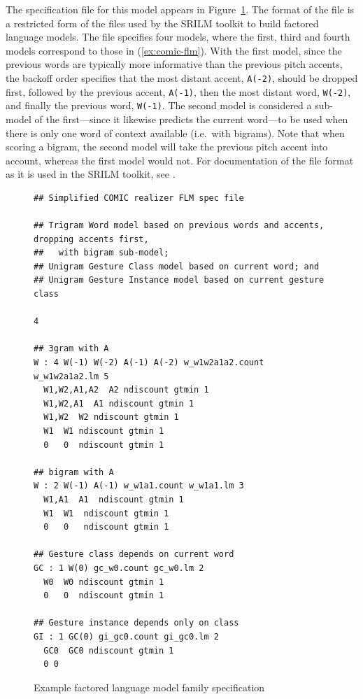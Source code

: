 \documentclass[11pt]{article}
\newcommand{\code}[1]{\texttt{#1}} %
\newcommand{\eref}[2][]{(\ref{ex:#2}#1)} %
\begin{document}
The specification file for this model appears in Figure~\ref{flm-spec}.
The format of the file is a restricted form of the files used by the
SRILM toolkit to build factored language models. The file specifies four
models, where the first, third and fourth models correspond to those in
\eref{comic-flm}. With the first model, since the previous words are
typically more informative than the previous pitch accents, the backoff
order specifies that the most distant accent, \code{A(-2)}, should be
dropped first, followed by the previous accent, \code{A(-1)}, then the
most distant word, \code{W(-2)}, and finally the previous word,
\code{W(-1)}. The second model is considered a sub-model of the
first---since it likewise predicts the current word---to be used when
there is only one word of context available (i.e.\ with bigrams). Note
that when scoring a bigram, the second model will take the previous
pitch accent into account, whereas the first model would not. For
documentation of the file format as it is used in the SRILM toolkit, see
\cite{FLM-JHSW:2002}.

\begin{figure}%
\begin{footnotesize}
\begin{verbatim}
## Simplified COMIC realizer FLM spec file

## Trigram Word model based on previous words and accents, dropping accents first, 
##   with bigram sub-model;
## Unigram Gesture Class model based on current word; and 
## Unigram Gesture Instance model based on current gesture class

4

## 3gram with A
W : 4 W(-1) W(-2) A(-1) A(-2) w_w1w2a1a2.count w_w1w2a1a2.lm 5
  W1,W2,A1,A2  A2 ndiscount gtmin 1 
  W1,W2,A1  A1 ndiscount gtmin 1 
  W1,W2  W2 ndiscount gtmin 1 
  W1  W1 ndiscount gtmin 1 
  0   0  ndiscount gtmin 1

## bigram with A
W : 2 W(-1) A(-1) w_w1a1.count w_w1a1.lm 3
  W1,A1  A1  ndiscount gtmin 1 
  W1  W1  ndiscount gtmin 1 
  0   0   ndiscount gtmin 1

## Gesture class depends on current word
GC : 1 W(0) gc_w0.count gc_w0.lm 2
  W0  W0 ndiscount gtmin 1 
  0   0  ndiscount gtmin 1

## Gesture instance depends only on class
GI : 1 GC(0) gi_gc0.count gi_gc0.lm 2
  GC0  GC0 ndiscount gtmin 1
  0 0
\end{verbatim}
\end{footnotesize}
\caption{Example factored language model family specification}
\label{flm-spec}
\end{figure}
\end{document}
